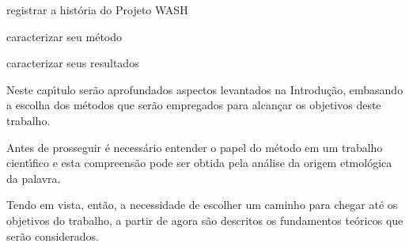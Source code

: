 \documentclass[
12pt,		%
openright,	%
twoside,  %
a4paper,			%
chapter=TITLE,		%
english,			%
french,				%
spanish,			%
brazil				%
]{USPSC-classe/USPSC_RedarTex}
\begin{document}
\begin{alineas}
\item registrar a hist\'oria do Projeto WASH
\item caracterizar seu m\'etodo
\item caracterizar seus resultados
\end{alineas}

Neste cap\'{\i}tulo ser\~ao aprofundados aspectos levantados na Introdu\c{c}\~ao, embasando a escolha dos m\'etodos que ser\~ao empregados para alcan\c{c}ar os objetivos deste trabalho.








Antes de prosseguir \'e necess\'ario entender o papel do m\'etodo em um trabalho cient\'{\i}fico e esta compreens\~ao pode ser obtida pela an\'alise da origem etmol\'ogica da palavra.









\noindent\begin{center}\mbox{\centering{}}\end{center}











Tendo em vista, ent\~ao, a necessidade de escolher um caminho para chegar at\'e os objetivos do trabalho, a partir de agora s\~ao descritos os fundamentos te\'oricos que ser\~ao considerados.
\end{document}

